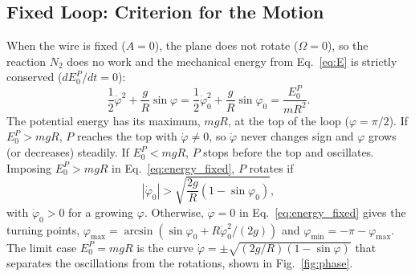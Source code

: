\documentclass[11pt,a4paper]{article}
\numberwithin{equation}{section}
\begin{document}
\subsection{Fixed Loop: Criterion for the Motion}
When the wire is fixed ($A = 0$), the plane does not rotate ($\Omega = 0$), so the reaction $N_2$ does no work and the mechanical energy from Eq.~\eqref{eq:E} is strictly conserved ($dE_0^P/dt = 0$):
\begin{equation}
\frac{1}{2}\dot{\varphi}^2 + \frac{g}{R}\sin\varphi = \frac{1}{2}\dot{\varphi}_0^2 + \frac{g}{R}\sin\varphi_0 = \frac{E_0^P}{mR^2}.
\label{eq:energy_fixed}
\end{equation}
The potential energy has its maximum, $mgR$, at the top of the loop ($\varphi = \pi/2$). If $E_0^P > mgR$, $P$ reaches the top with $\dot{\varphi} \neq 0$, so $\dot{\varphi}$ never changes sign and $\varphi$ grows (or decreases) steadily. If $E_0^P < mgR$, $P$ stops before the top and oscillates. Imposing $E_0^P > mgR$ in Eq.~\eqref{eq:energy_fixed}, $P$ rotates if
\begin{equation}
|\dot{\varphi}_0| > \sqrt{\frac{2g}{R}(1 - \sin\varphi_0)},
\label{eq:crit_rate}
\end{equation}
with $\dot{\varphi}_0 > 0$ for a growing $\varphi$. Otherwise, $\dot{\varphi} = 0$ in Eq.~\eqref{eq:energy_fixed} gives the turning points, $\varphi_{\max} = \arcsin(\sin\varphi_0 + R\dot{\varphi}_0^2 / (2g))$ and $\varphi_{\min} = -\pi - \varphi_{\max}$. The limit case $E_0^P = mgR$ is the curve $\dot{\varphi} = \pm\sqrt{(2g/R)(1 - \sin\varphi)}$ that separates the oscillations from the rotations, shown in Fig.~\ref{fig:phase}.
\end{document}
